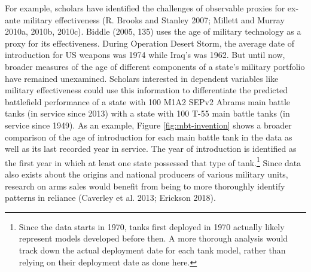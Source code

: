 \documentclass[
]{article}
\begin{document}
For example, scholars have identified the challenges of observable proxies for ex-ante military effectiveness (R. Brooks and Stanley 2007; Millett and Murray 2010a, 2010b, 2010c). Biddle (2005, 135) uses the age of military technology as a proxy for its effectiveness. During Operation Desert Storm, the average date of introduction for US weapons was 1974 while Iraq's was 1962. But until now, broader measures of the age of different components of a state's military portfolio have remained unexamined. Scholars interested in dependent variables like military effectiveness could use this information to differentiate the predicted battlefield performance of a state with 100 M1A2 SEPv2 Abrams main battle tanks (in service since 2013) with a state with 100 T-55 main battle tanks (in service since 1949). As an example, Figure \ref{fig:mbt-invention} shows a broader comparison of the age of introduction for each main battle tank in the data as well as its last recorded year in service. The year of introduction is identified as the first year in which at least one state possessed that type of tank.\footnote{Since the data starts in 1970, tanks first deployed in 1970 actually likely represent models developed before then. A more thorough analysis would track down the actual deployment date for each tank model, rather than relying on their deployment date as done here.} Since data also exists about the origins and national producers of various military units, research on arms sales would benefit from being to more thoroughly identify patterns in reliance (Caverley et al. 2013; Erickson 2018).
\end{document}
